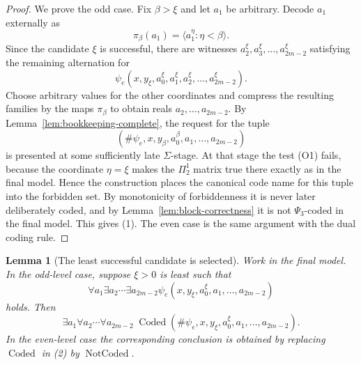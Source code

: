 \documentclass[11pt]{article}
\theoremstyle{plain}
\newtheorem{lemma}[theorem]{Lemma}
\theoremstyle{definition}
\theoremstyle{remark}
\newcommand{\PsiThree}{\Psi_{3}}
\begin{document}
\begin{proof}
We prove the odd case.  Fix $\beta>\xi$ and let $a_1$ be arbitrary.  Decode
$a_1$ externally as
\[
\pi_\beta(a_1)=\langle a_1^\eta:\eta<\beta\rangle.
\]
Since the candidate $\xi$ is successful, there are witnesses
$a_2^\xi,a_3^\xi,\ldots,a_{2m-2}^\xi$ satisfying the remaining alternation for
\[
\psi_e(x,y_\xi,a^\xi_0,a_1^\xi,a_2^\xi,\ldots,a_{2m-2}^\xi).
\]
Choose arbitrary values for the other coordinates and compress the resulting
families by the maps $\pi_\beta$ to obtain reals $a_2,\ldots,a_{2m-2}$.  By
Lemma~\ref{lem:bookkeeping-complete}, the request for the tuple
\[
(\#\psi_e,x,y_\beta,a^\beta_0,a_1,\ldots,a_{2m-2})
\]
is presented at some sufficiently late $\Sigma$-stage.  At that stage the test
(O1) fails, because the coordinate $\eta=\xi$ makes the $\Pi^1_2$ matrix true
there exactly as in the final model.  Hence the construction places the
canonical code name for this tuple into the forbidden set.  By monotonicity of
forbiddenness it is never later deliberately coded, and by
Lemma~\ref{lem:block-correctness} it is not $\PsiThree$-coded in the final model.
This gives (1).  The even case is the same argument with the dual coding rule.
\end{proof}

\begin{lemma}[The least successful candidate is selected]\label{lem:least-selected}
Work in the final model.  In the odd-level case, suppose $\xi>0$ is least such
that
\[
\forall a_1\exists a_2\cdots\exists a_{2m-2}
\psi_e(x,y_\xi,a^\xi_0,a_1,\ldots,a_{2m-2})
\]
holds.  Then
\[
\exists a_1\forall a_2\cdots\forall a_{2m-2}\;
\operatorname{Coded}(\#\psi_e,x,y_\xi,a^\xi_0,a_1,\ldots,a_{2m-2}).
\tag{2}
\]
In the even-level case the corresponding conclusion is obtained by replacing
$\operatorname{Coded}$ in (2) by $\operatorname{NotCoded}$.
\end{lemma}
\end{document}
